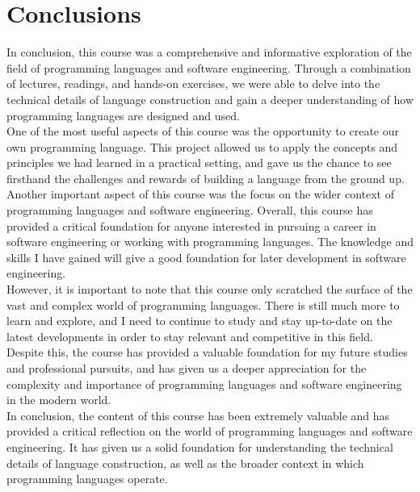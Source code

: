 \documentclass{article}
\theoremstyle{theorem}
\theoremstyle{definition}
\theoremstyle{remark}
\begin{document}
\section{Conclusions}\label{conclusions}

\indent	
In conclusion, this course was a comprehensive and informative exploration of the field of programming languages and software engineering. Through a combination of lectures, readings, and hands-on exercises, we were able to delve into the technical details of language construction and gain a deeper understanding of how programming languages are designed and used.
\\
\indent One of the most useful aspects of this course was the opportunity to create our own programming language. This project allowed us to apply the concepts and principles we had learned in a practical setting, and gave us the chance to see firsthand the challenges and rewards of building a language from the ground up.
Another important aspect of this course was the focus on the wider context of programming languages and software engineering.
Overall, this course has provided a critical foundation for anyone interested in pursuing a career in software engineering or working with programming languages. The knowledge and skills I have gained will give a good foundation for later development in software engineering.
	\\
 \indent
However, it is important to note that this course only scratched the surface of the vast and complex world of programming languages. There is still much more to learn and explore, and I need to continue to study and stay up-to-date on the latest developments in order to stay relevant and competitive in this field.
\\
	\indent
Despite this, the course has provided a valuable foundation for my future studies and 	professional pursuits, and has given us a deeper appreciation for the complexity and importance of programming languages and software engineering in the modern world.
\\
\indent
In conclusion, the content of this course has been extremely valuable and has provided a critical reflection on the world of programming languages and software engineering. It has given us a solid foundation for understanding the technical details of language construction, as well as the broader context in which programming languages operate. 
\end{document}

